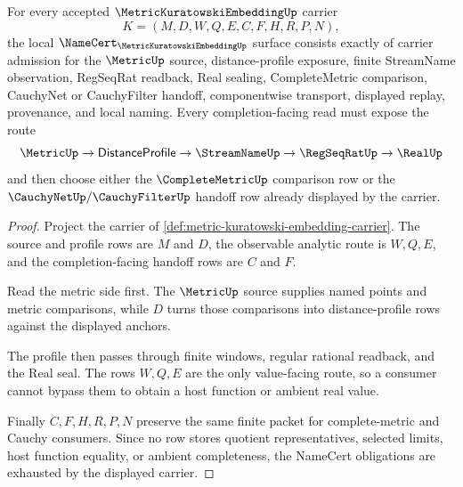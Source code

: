 \begin{theorem}
\label{thm:metric-kuratowski-embedding-namecert-obligations}
For every accepted $\MetricKuratowskiEmbeddingUp$ carrier
$$
K=(M,D,W,Q,E,C,F,H,R,P,N),
$$
the local $\NameCert_{\MetricKuratowskiEmbeddingUp}$ surface consists exactly of carrier admission for the $\MetricUp$ source, distance-profile exposure, finite StreamName observation, RegSeqRat readback, Real sealing, CompleteMetric comparison, CauchyNet or CauchyFilter handoff, componentwise transport, displayed replay, provenance, and local naming. Every completion-facing read must expose the route
$$
\MetricUp \to \mathsf{DistanceProfile} \to \StreamNameUp \to \RegSeqRatUp \to \RealUp
$$
and then choose either the $\CompleteMetricUp$ comparison row or the $\CauchyNetUp/\CauchyFilterUp$ handoff row already displayed by the carrier.
\end{theorem}
\begin{proof}
Project the carrier of \autoref{def:metric-kuratowski-embedding-carrier}. The source and profile rows are $M$ and $D$, the observable analytic route is $W,Q,E$, and the completion-facing handoff rows are $C$ and $F$.

Read the metric side first. The $\MetricUp$ source supplies named points and metric comparisons, while $D$ turns those comparisons into distance-profile rows against the displayed anchors.

The profile then passes through finite windows, regular rational readback, and the Real seal. The rows $W,Q,E$ are the only value-facing route, so a consumer cannot bypass them to obtain a host function or ambient real value.

Finally $C,F,H,R,P,N$ preserve the same finite packet for complete-metric and Cauchy consumers. Since no row stores quotient representatives, selected limits, host function equality, or ambient completeness, the NameCert obligations are exhausted by the displayed carrier.
\end{proof}


